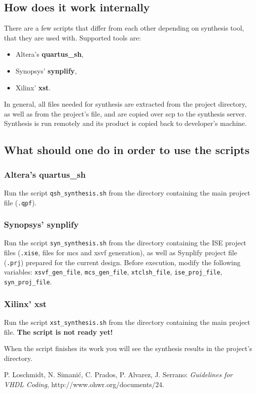 \documentclass[a4paper,10pt]{article}
\begin{document}
\subsection{How does it work internally}
There are a few scripts that differ from each other depending on synthesis tool, that they are used with. Supported tools are:
\begin{itemize}
\item Altera's \textbf{quartus\_sh},
\item Synopsys' \textbf{synplify},
\item Xilinx' \textbf{xst}.
\end{itemize}
In general, all files needed for synthesis are extracted from the project directory, as well as from the project's file, and are copied over scp to the synthesis server. Synthesis is run remotely and its product is copied back to developer's machine.
\subsection{What should one do in order to use the scripts}
\subsubsection{Altera's quartus\_sh}
Run the script \verb!qsh_synthesis.sh! from the directory containing the main project file (\verb!.qpf!).  
\subsubsection{Synopsys' synplify}
Run the script \verb!syn_synthesis.sh! from the directory containing the ISE project files (\verb!.xise!, files for mcs and xsvf generation), as well as Synplify project file (\verb!.prj!) prepared for the current design. Before execution, modify the following variables: \verb!xsvf_gen_file!, \verb!mcs_gen_file!, \verb!xtclsh_file!, \verb!ise_proj_file!, \verb!syn_proj_file!.

\subsubsection{Xilinx' xst}
Run the script \verb!xst_synthesis.sh! from the directory containing the main project file.  \textbf{The script is not ready yet!}
\vspace{1cm}

\noindent When the script finishes its work you will see the synthesis results in the project's directory.

\begin{thebibliography}{9}%
P. Loschmidt, N. Simanić, C. Prados,
P. Alvarez, J. Serrano: \emph{Guidelines for VHDL Coding},
http://www.ohwr.org/documents/24.
\end{thebibliography}
\end{document}

